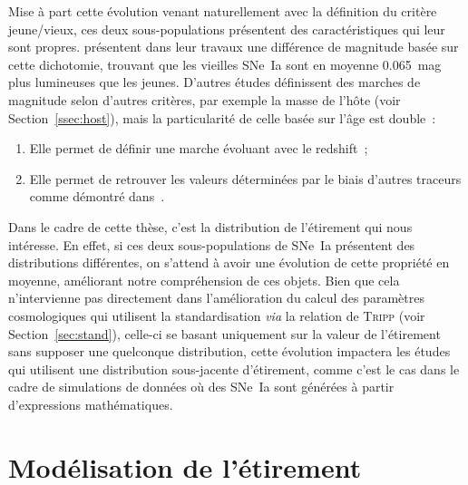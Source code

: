 \documentclass[../main/main.tex]{subfiles}
\begin{document}
Mise à part cette évolution venant naturellement avec la définition du critère
jeune/vieux, ces deux sous-populations présentent des caractéristiques qui leur
sont propres. \cite{rigault2020} présentent dans leur travaux une différence de
magnitude basée sur cette dichotomie, trouvant que les vieilles SNe~Ia sont en
moyenne \SI{0.065}{mag} plus lumineuses que les jeunes. D'autres études
définissent des marches de magnitude selon d'autres critères, par exemple la
masse de l'hôte (voir Section~\ref{ssec:host}), mais la particularité de celle
basée sur l'âge est double~:
\begin{enumerate}
    \item Elle permet de définir une marche évoluant avec le redshift~;
    \item Elle permet de retrouver les valeurs déterminées par le biais d'autres
        traceurs comme démontré dans~\cite{briday2022}.
\end{enumerate}

Dans le cadre de cette thèse, c'est la distribution de l'étirement qui nous
intéresse. En effet, si ces deux sous-populations de SNe~Ia présentent des
distributions différentes, on s'attend à avoir une évolution de cette propriété
en moyenne, améliorant notre compréhension de ces objets. Bien que cela
n'intervienne pas directement dans l'amélioration du calcul des paramètres
cosmologiques qui utilisent la standardisation \textit{via} la relation de
\textsc{Tripp} (voir Section~\ref{sec:stand}), celle-ci se basant uniquement sur
la valeur de l'étirement sans supposer une quelconque distribution, cette
évolution impactera les études qui utilisent une distribution sous-jacente
d'étirement, comme c'est le cas dans le cadre de simulations de données où des
SNe~Ia sont générées à partir d'expressions mathématiques.

\section{Modélisation de l'étirement}\label{sec:xmod}
\end{document}
